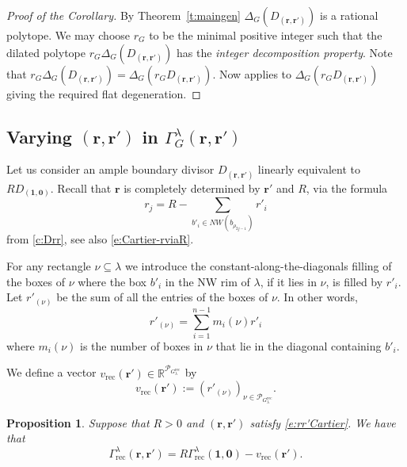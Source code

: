 \documentclass{amsart}
\newtheorem{proposition}[thm]{Proposition}
\theoremstyle{definition}
\numberwithin{equation}{section}
\newcommand{\NO}{\Delta}
\newcommand{\R}{\mathbb R}
\newcommand{\RG}{r_G}
\newcommand{\rect}{\mathrm{rec}}
\begin{document}
\begin{proof}[Proof of the Corollary]
By Theorem~\ref{t:maingen} $\NO_G(D_{(\mathbf r,\mathbf r')})$ is a rational polytope. We may choose $\RG$ to be the minimal positive integer such that
the dilated polytope $\RG\NO_G(D_{(\mathbf r,\mathbf r')})$ has the \emph{integer decomposition property}. Note that $\RG\NO_G( D_{(\mathbf r,\mathbf r')})=\NO_G(\RG D_{(\mathbf r,\mathbf r')})$. Now \cite{Anderson} applies to $\NO_G(\RG D_{(\mathbf r,\mathbf r')})$ giving the required flat degeneration.
\end{proof}



\subsection{Varying $(\mathbf r,\mathbf r')$ in $\Gamma^\lambda_G(\mathbf r,\mathbf {r'})$ }\label{s:GammaShifts}


Let us consider an ample boundary divisor $D_{(\mathbf r,\mathbf r')}$ linearly equivalent to $RD_{(\mathbf 1,\mathbf 0)}$. Recall that $\mathbf r$ is completely determined by $\mathbf r'$ and $R$, via the formula
\begin{equation}\label{e:rr'Cartier}
r_j=R-\sum_{b'_{i}\in NW(b_{\rho_{2j-1}})}r'_i
\end{equation}
from \cref{c:Drr}, see also  \eqref{e:Cartier-rviaR}. 

For any rectangle $\nu \subseteq \lambda$ we introduce the 
constant-along-the-diagonals filling of the boxes of $\nu$ where the box $b'_i$ in the NW rim of $\lambda$, if it lies in $\nu$, is filled by $r'_i$. Let $r'_{(\nu)}$ be the sum of all the entries of the boxes of $\nu$. In other words, 
\begin{equation}\label{e:vrectcomponents}
	r'_{(\nu)}=\sum_{i=1}^{n-1}m_i(\nu) r'_i
\end{equation}
where $m_i(\nu)$ is the number of boxes in $\nu$ that lie in the diagonal containing $b'_i$.

We define a vector $v_{\rect}(\mathbf r')\in\R^{\mathcal P_{G_{\lambda}^{\rect}}}$ by
  \begin{equation}\label{e:vGr'}
	  v_\rect(\mathbf r'):=(r'_{(\nu)})_{\nu\in\mathcal P_{G_{\lambda}^{\rect}}}. 
  \end{equation}

\begin{proposition}\label{p:GammaShiftRect} Suppose that $R>0$ and $(\mathbf r,\mathbf r')$ satisfy \eqref{e:rr'Cartier}. We have that
\[
\Gamma^\lambda_{\rect}(\mathbf r,\mathbf r')=R\Gamma^\lambda_\rect(\mathbf 1,\mathbf 0)-v_\rect(\mathbf r').
\]
\end{proposition}
\end{document}

